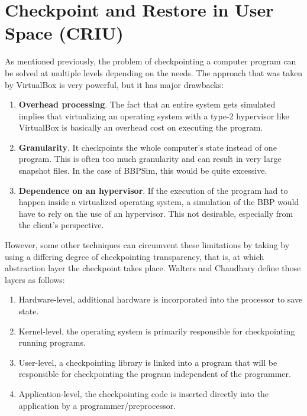 \section{Checkpoint and Restore in User Space (CRIU)}\label{sec:criu}
As mentioned previously, the problem of checkpointing a computer program can be solved at multiple levels depending on the needs. The approach that was taken by VirtualBox is very powerful, but it has major drawbacks:
\begin{enumerate}
	\item \textbf{Overhead processing}. The fact that an entire system gets simulated implies that virtualizing an operating system with a type-2 hypervisor like VirtualBox is basically an overhead cost on executing the program. 
	\item \textbf{Granularity}. It checkpoints the whole computer's state instead of one program. This is often too much granularity and can result in very large snapshot files. In the case of \gls{BBPSim}, this would be quite excessive.
	\item \textbf{Dependence on an hypervisor}. If the execution of the program had to happen inside a virtualized operating system, a simulation of the \gls{BBP} would have to rely on the use of an hypervisor. This not desirable, especially from the client's perspective.
\end{enumerate}

However, some other techniques can circumvent these limitations by taking by using a differing degree of checkpointing transparency, that is, at which abstraction layer the checkpoint takes place. Walters and Chaudhary define those layers as follows: 
\begin{shadedquotation}
\begin{enumerate}
	\item Hardware-level, additional hardware is incorporated into the processor to
save state.
	\item Kernel-level, the operating system is primarily responsible for checkpointing
running programs.
	\item User-level, a checkpointing library is linked into a program that will be responsible for checkpointing the program independent of the programmer.
	\item Application-level, the checkpointing code is inserted directly into the application by a programmer/preprocessor.
\end{enumerate}
\cite{paper:app-level-chkpt}
\end{shadedquotation}


